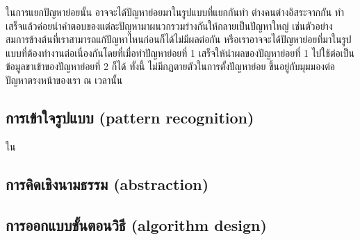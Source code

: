 ในการแยกปัญหาย่อยนั้น อาจจะได้ปัญหาย่อยมาในรูปแบบที่แยกกันทำ ต่างคนต่างอิสระจากกัน ทำเสร็จแล้วค่อยนำคำตอบของแต่ละปัญหามาผนวกรวมร่างกันให้กลายเป็นปัญหาใหญ่ เช่นตัวอย่างสมการข้างต้นที่เราสามารถแก้ปัญหาไหนก่อนก็ได้ไม่มีผลต่อกัน หรือเราอาจจะได้ปัญหาย่อยที่มาในรูปแบบที่ต้องทำงานต่อเนื่องกันโดยที่เมื่อทำปัญหาย่อยที่ 1 เสร็จให้นำผลของปัญหาย่อยที่ 1 ไปใช้ต่อเป็นข้อมูลขาเข้าของปัญหาย่อยที่ 2 ก็ได้ ทั้งนี้ ไม่มีกฏตายตัวในการตั้งปัญหาย่อย ขึ้นอยู่กับมุมมองต่อปัญหาตรงหน้าของเรา ณ เวลานั้น

\subsection{การเข้าใจรูปแบบ (pattern recognition)}
ใน


\subsection{การคิดเชิงนามธรรม (abstraction)}


\subsection{การออกแบบขั้นตอนวิธี (algorithm design)}





